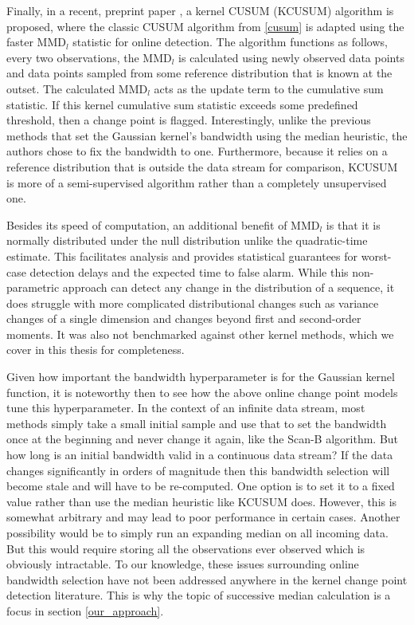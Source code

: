 Finally, in a recent, preprint paper \cite{flynn2019change}, a kernel CUSUM (KCUSUM) algorithm is proposed, where the classic CUSUM algorithm from \ref{cusum} is adapted using the faster MMD$_l$ statistic for online detection. The algorithm functions as follows, every two observations, the MMD$_l$ is calculated using newly observed data points and data points sampled from some reference distribution that is known at the outset. The calculated MMD$_l$ acts as the update term to the cumulative sum statistic. If this kernel cumulative sum statistic exceeds some predefined threshold, then a change point is flagged. Interestingly, unlike the previous methods that set the Gaussian kernel's bandwidth using the median heuristic, the authors chose to fix the bandwidth to one. Furthermore, because it relies on a reference distribution that is outside the data stream for comparison, KCUSUM is more of a semi-supervised algorithm rather than a completely unsupervised one. %

Besides its speed of computation, an additional benefit of MMD$_l$ is that it is normally distributed under the null distribution unlike the quadratic-time estimate. This facilitates analysis and provides statistical guarantees for worst-case detection delays and the expected time to false alarm. While this non-parametric approach can detect any change in the distribution of a sequence, it does struggle with more complicated distributional changes such as variance changes of a single dimension and changes beyond first and second-order moments. It was also not benchmarked against other kernel methods, which we cover in this thesis for completeness.

Given how important the bandwidth hyperparameter is for the Gaussian kernel function, it is noteworthy then to see how the above online change point models tune this hyperparameter. In the context of an infinite data stream, most methods simply take a small initial sample and use that to set the bandwidth once at the beginning and never change it again, like the Scan-B algorithm. But how long is an initial bandwidth valid in a continuous data stream? If the data changes significantly in orders of magnitude then this bandwidth selection will become stale and will have to be re-computed. One option is to set it to a fixed value rather than use the median heuristic like KCUSUM does. However, this is somewhat arbitrary and may lead to poor performance in certain cases. Another possibility would be to simply run an expanding median on all incoming data. But this would require storing all the observations ever observed which is obviously intractable. To our knowledge, these issues surrounding online bandwidth selection have not been addressed anywhere in the kernel change point detection literature. This is why the topic of successive median calculation is a focus in section \ref{our_approach}.

